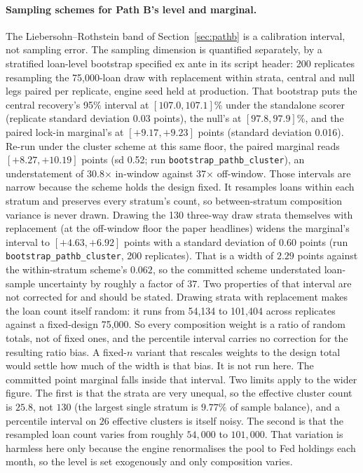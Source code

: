 \documentclass[12pt]{article}
\begin{document}
\paragraph{Sampling schemes for Path B's level and marginal.}
The Liebersohn--Rothstein band of Section~\ref{sec:pathb} is a calibration interval, not sampling error. The sampling dimension is quantified separately, by a stratified loan-level bootstrap specified ex ante in its script header: 200 replicates resampling the 75,000-loan draw with replacement within strata, central and null legs paired per replicate, engine seed held at production. That bootstrap puts the central recovery's 95\% interval at $[107.0, 107.1]\%$ under the standalone scorer (replicate standard deviation 0.03 points), the null's at $[97.8, 97.9]\%$, and the paired lock-in marginal's at $[+9.17, +9.23]$ points (standard deviation 0.016). Re-run under the cluster scheme at this same floor, the paired marginal reads $[+8.27, +10.19]$ points (sd 0.52; run \texttt{bootstrap\_pathb\_cluster}), an understatement of 30.8$\times$ in-window against 37$\times$ off-window. Those intervals are narrow because the scheme holds the design fixed. It resamples loans within each stratum and preserves every stratum's count, so between-stratum composition variance is never drawn. Drawing the 130 three-way draw strata themselves with replacement (at the off-window floor the paper headlines) widens the marginal's interval to $[+4.63, +6.92]$ points with a standard deviation of $0.60$ points (run \texttt{bootstrap\_pathb\_cluster}, 200 replicates). That is a width of $2.29$ points against the within-stratum scheme's $0.062$, so the committed scheme understated loan-sample uncertainty by roughly a factor of $37$. Two properties of that interval are not corrected for and should be stated. Drawing strata with replacement makes the loan count itself random: it runs from 54,134 to 101,404 across replicates against a fixed-design 75,000. So every composition weight is a ratio of random totals, not of fixed ones, and the percentile interval carries no correction for the resulting ratio bias. A fixed-$n$ variant that rescales weights to the design total would settle how much of the width is that bias. It is not run here. The committed point marginal falls inside that interval. Two limits apply to the wider figure. The first is that the strata are very unequal, so the effective cluster count is $25.8$, not $130$ (the largest single stratum is $9.77\%$ of sample balance), and a percentile interval on $26$ effective clusters is itself noisy. The second is that the resampled loan count varies from roughly $54{,}000$ to $101{,}000$. That variation is harmless here only because the engine renormalises the pool to Fed holdings each month, so the level is set exogenously and only composition varies.
\end{document}
